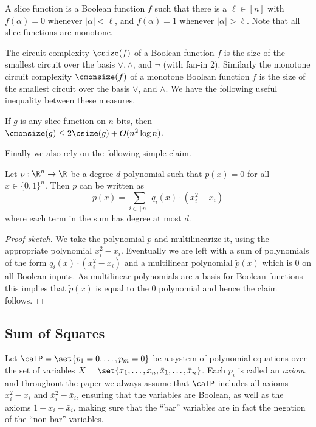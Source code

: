 A slice function is a Boolean function $f$ such that there is a
$\ell \in [n]$ with $f(\alpha) = 0$ whenever $|\alpha| < \ell$, and
$f(\alpha) = 1$ whenever $|\alpha| > \ell$.  Note that all slice
functions are monotone.

The circuit complexity $\csize(f)$ of a Boolean function $f$ is the
size of the smallest circuit over the basis $\vee, \wedge$, and
$\lnot$ (with fan-in $2$). Similarly the monotone circuit
complexity $\cmonsize(f)$ of a monotone Boolean function $f$
is the size of the smallest circuit over the basis $\vee$, and
$\wedge$. We have the following useful inequality between these
measures.

\begin{lemma}[\cite{B82}]\label{lem:slice}
  If $g$ is any slice function on $n$ bits, then
  $\cmonsize(g) \le 2 \csize(g) + O(n^2 \log n)$.
\end{lemma}

Finally we also rely on the following simple claim.

\begin{claim}
  \label{claim:0 mod bool}
  Let $p: \R^n \rightarrow \R$ be a degree $d$ polynomial such that
  $p(x) = 0$ for all $x \in \{0,1\}^n$.  Then $p$ can be written as
  \[
    p(x) = \sum_{i \in [n]} q_i(x) \cdot (x_i^2-x_i)
  \]
  where each term in the sum has degree at most $d$.
\end{claim}

\begin{proof}[Proof sketch]
  We take the polynomial $p$ and multilinearize it, using the
  appropriate polynomial $x_i^2 - x_i$. Eventually we are left with a
  sum of polynomials of the form $q_i(x)\cdot(x_i^2 - x_i)$ and a
  multilinear polynomial $\tilde p(x)$ which is $0$ on all Boolean
  inputs.  As multilinear polynomials are a basis for Boolean
  functions this implies that $\tilde p(x)$ is equal to the $0$
  polynomial and hence the claim follows.
\end{proof}

\subsection{Sum of Squares}
\label{sec:known-SoS-results}

Let $\calP = \set{p_1 = 0, \ldots, p_m = 0}$ be a system of polynomial
equations over the set of variables
$X = \set{x_1, \ldots, x_n, \bar{x}_1, \ldots, \bar{x}_n}$.  Each
$p_i$ is called an \emph{axiom}, and throughout the paper we always
assume that $\calP$ includes all axioms $x_i^2 - x_i$ and
$\bar{x}_i^2 - \bar{x}_i$, ensuring that the variables are Boolean, as
well as the axioms $1 - x_i - \bar{x}_i$, making sure that the ``bar''
variables are in fact the negation of the ``non-bar'' variables.

